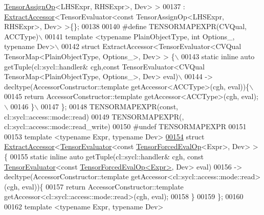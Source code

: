 \begin{DoxyCode}
      \hyperlink{class_eigen_1_1_tensor_assign_op}{TensorAssignOp}<LHSExpr, RHSExpr>, Dev> >
00137 : \hyperlink{struct_eigen_1_1_tensor_sycl_1_1internal_1_1_extract_accessor}{ExtractAccessor}<TensorEvaluator<const TensorAssignOp<LHSExpr, RHSExpr>, Dev> >\{\};
00138 
00140 \textcolor{preprocessor}{#define TENSORMAPEXPR(CVQual, ACCType)\(\backslash\)}
00141 \textcolor{preprocessor}{template <typename PlainObjectType, int Options\_, typename Dev>\(\backslash\)}
00142 \textcolor{preprocessor}{struct ExtractAccessor<TensorEvaluator<CVQual TensorMap<PlainObjectType, Options\_>, Dev> > \{\(\backslash\)}
00143 \textcolor{preprocessor}{  static inline auto getTuple(cl::sycl::handler& cgh,const TensorEvaluator<CVQual
       TensorMap<PlainObjectType, Options\_>, Dev> eval)\(\backslash\)}
00144 \textcolor{preprocessor}{  -> decltype(AccessorConstructor::template getAccessor<ACCType>(cgh, eval))\{\(\backslash\)}
00145 \textcolor{preprocessor}{    return AccessorConstructor::template getAccessor<ACCType>(cgh, eval);\(\backslash\)}
00146 \textcolor{preprocessor}{  \}\(\backslash\)}
00147 \textcolor{preprocessor}{\};}
00148 TENSORMAPEXPR(\textcolor{keyword}{const}, cl::sycl::access::mode::read)
00149 TENSORMAPEXPR(, cl::sycl::access::mode::read\_write)
00150 \textcolor{preprocessor}{#undef TENSORMAPEXPR}
00151 
00153 \textcolor{keyword}{template} <\textcolor{keyword}{typename} Expr, \textcolor{keyword}{typename} Dev>
\hyperlink{struct_eigen_1_1_tensor_sycl_1_1internal_1_1_extract_accessor_3_01_tensor_evaluator_3_01const_013395e9fe3132eea75a45ddd051e36016}{00154} \textcolor{keyword}{struct }\hyperlink{struct_eigen_1_1_tensor_sycl_1_1internal_1_1_extract_accessor}{ExtractAccessor}<\hyperlink{struct_eigen_1_1_tensor_evaluator}{TensorEvaluator}<const 
      \hyperlink{class_eigen_1_1_tensor_forced_eval_op}{TensorForcedEvalOp}<Expr>, Dev> > \{
00155   \textcolor{keyword}{static} \textcolor{keyword}{inline} \textcolor{keyword}{auto} getTuple(cl::sycl::handler& cgh, \textcolor{keyword}{const} \hyperlink{struct_eigen_1_1_tensor_evaluator}{TensorEvaluator}<\textcolor{keyword}{const} 
      \hyperlink{class_eigen_1_1_tensor_forced_eval_op}{TensorForcedEvalOp<Expr>}, Dev> eval)
00156   -> decltype(AccessorConstructor::template getAccessor<cl::sycl::access::mode::read>(cgh, eval))\{
00157     \textcolor{keywordflow}{return} AccessorConstructor::template getAccessor<cl::sycl::access::mode::read>(cgh, eval);
00158   \}
00159 \};
00160 
00162 \textcolor{keyword}{template} <\textcolor{keyword}{typename} Expr, \textcolor{keyword}{typename} Dev>

\end{DoxyCode}
